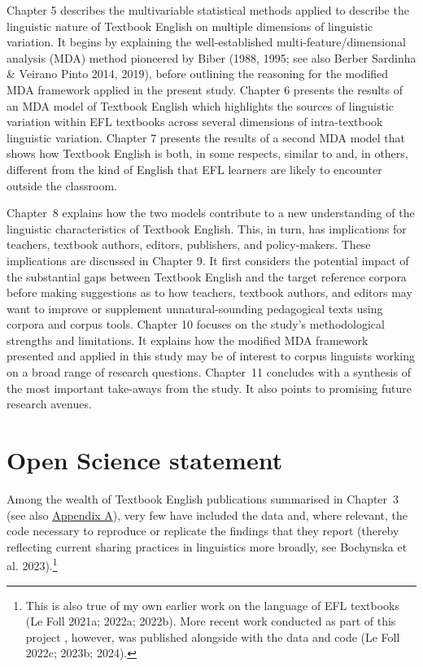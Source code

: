 \documentclass[
  letterpaper,
  DIV=11,
  numbers=noendperiod]{scrreprt}
\begin{document}
Chapter 5 describes the multivariable statistical methods applied to
describe the linguistic nature of Textbook English on multiple
dimensions of linguistic variation. It begins by explaining the
well-established multi-feature/dimensional analysis (MDA) method
pioneered by Biber (1988, 1995; see also Berber Sardinha \& Veirano
Pinto 2014, 2019), before outlining the reasoning for the modified MDA
framework applied in the present study. Chapter 6 presents the results
of an MDA model of Textbook English which highlights the sources of
linguistic variation within EFL textbooks across several dimensions of
intra-textbook linguistic variation. Chapter 7 presents the results of a
second MDA model that shows how Textbook English is both, in some
respects, similar to and, in others, different from the kind of English
that EFL learners are likely to encounter outside the classroom.

Chapter~8 explains how the two models contribute to a new understanding
of the linguistic characteristics of Textbook English. This, in turn,
has implications for teachers, textbook authors, editors, publishers,
and policy-makers. These implications are discussed in Chapter 9. It
first considers the potential impact of the substantial gaps between
Textbook English and the target reference corpora before making
suggestions as to how teachers, textbook authors, and editors may want
to improve or supplement unnatural‑sounding pedagogical texts using
corpora and corpus tools. Chapter 10 focuses on the study's
methodological strengths and limitations. It explains how the modified
MDA framework presented and applied in this study may be of interest to
corpus linguists working on a broad range of research questions.
Chapter~11 concludes with a synthesis of the most important take-aways
from the study. It also points to promising future research avenues.


\chapter{Open Science statement}\label{open-science-statement}

Among the wealth of Textbook English publications summarised in
Chapter~3 (see also
\href{https://elenlefoll.github.io/TextbookMDA/AppendixA.html}{Appendix
A}), very few have included the data and, where relevant, the code
necessary to reproduce or replicate the findings that they report
(thereby reflecting current sharing practices in linguistics more
broadly, see Bochynska et al. 2023).\footnote{This is also true of my
  own earlier work on the language of EFL textbooks (Le Foll 2021a;
  2022a; 2022b). More recent work conducted as part of this project ,
  however, was published alongside with the data and code (Le Foll
  2022c; 2023b; 2024).}
\end{document}
